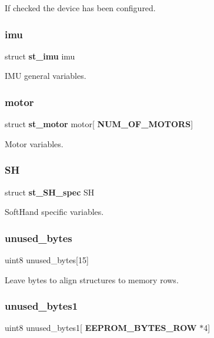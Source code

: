 If checked the device has been configured. \mbox{\label{structst__eeprom_a5587b913fbf50df4c3a5148dd8aab649}} 
\subsubsection{imu}
{\footnotesize\ttfamily struct \textbf{ st\+\_\+imu} imu}

I\+MU general variables. \mbox{\label{structst__eeprom_abe01764856595b55e98fe187ae4c9b54}} 
\subsubsection{motor}
{\footnotesize\ttfamily struct \textbf{ st\+\_\+motor} motor[\textbf{ N\+U\+M\+\_\+\+O\+F\+\_\+\+M\+O\+T\+O\+RS}]}

Motor variables. \mbox{\label{structst__eeprom_a48c2a3988657edd4d6b92f84a0d9d2d0}} 
\subsubsection{SH}
{\footnotesize\ttfamily struct \textbf{ st\+\_\+\+S\+H\+\_\+spec} SH}

Soft\+Hand specific variables. \mbox{\label{structst__eeprom_a23db079f0c6d3e264be3fb547f32403c}} 
\subsubsection{unused\+\_\+bytes}
{\footnotesize\ttfamily uint8 unused\+\_\+bytes[15]}

Leave bytes to align structures to memory rows. \mbox{\label{structst__eeprom_a0299e605ae8eb46c7aa7886e6b302a0f}} 
\subsubsection{unused\+\_\+bytes1}
{\footnotesize\ttfamily uint8 unused\+\_\+bytes1[\textbf{ E\+E\+P\+R\+O\+M\+\_\+\+B\+Y\+T\+E\+S\+\_\+\+R\+OW} $\ast$4]}

